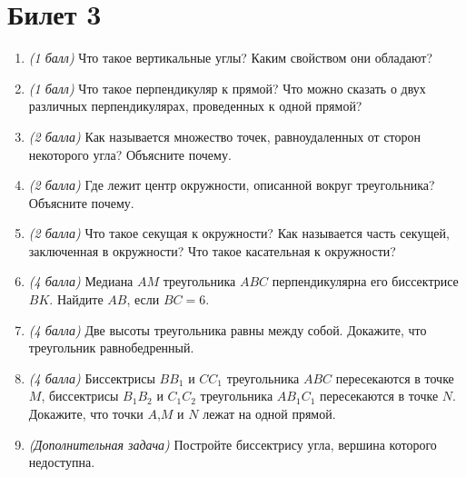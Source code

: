 \documentclass[12pt, a4paper]{article}
\begin{document}
\section*{Билет 3}
\begin{enumerate}
\item \textit{(1 балл)} Что такое вертикальные углы? Каким свойством они обладают?
\item \textit{(1 балл)} Что такое перпендикуляр к прямой? Что можно сказать о двух различных перпендикулярах, проведенных к одной прямой?
\item \textit{(2 балла)} Как называется множество точек, равноудаленных от сторон некоторого угла? Объясните почему.
\item \textit{(2 балла)} Где лежит центр окружности, описанной вокруг треугольника? Объясните почему.
\item \textit{(2 балла)} Что такое секущая к окружности? Как называется часть секущей, заключенная в окружности? Что такое касательная к окружности?
\item \textit{(4 балла)} Медиана $AM$ треугольника $ABC$ перпендикулярна его биссектрисе $BK$. Найдите $AB$, если $BC = 6$.
\item \textit{(4 балла)} Две высоты треугольника равны между собой. Докажите, что треугольник равнобедренный.
\item \textit{(4 балла)} Биссектрисы $BB_1$ и $CC_1$ треугольника $ABC$ пересекаются в точке $M$, биссектрисы $B_1B_2$ и $C_1C_2$ треугольника $AB_1C_1$ пересекаются в точке $N$. Докажите, что точки $A$,$M$ и $N$ лежат на одной прямой.
\item \textit{(Дополнительная задача)} Постройте биссектрису угла, вершина которого недоступна.
\end{enumerate}
\end{document}
